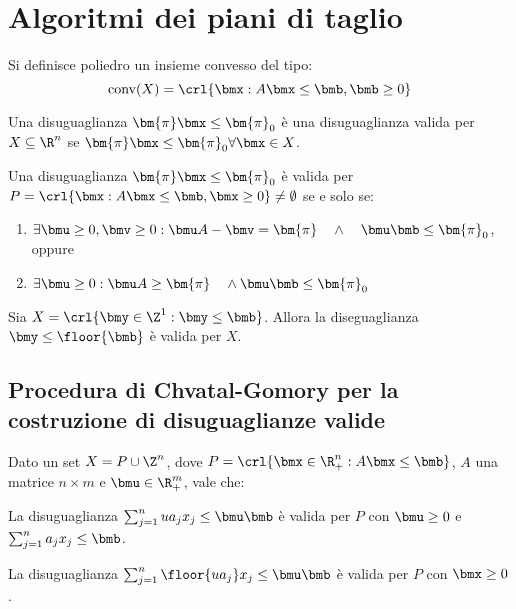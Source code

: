 \documentclass[\main/main.tex]{subfiles}
\begin{document}
\chapter{Algoritmi dei piani di taglio}

\begin{definition}[Poliedro]
    Si definisce poliedro un insieme convesso del tipo:
    \[
        \text{conv}(X) = \crl{\bmx: A\bmx \leq \bmb, \bmb \geq 0}
    \]
\end{definition}
\begin{definition}
    Una disuguaglianza \(\bm{\pi}\bmx \leq \bm{\pi}_0\) è una disuguaglianza valida per \(X \subseteq \R^n\) se \(\bm{\pi}\bmx \leq \bm{\pi}_0 \forall \bmx \in X\).
\end{definition}

\begin{proposition}
    Una disuguaglianza \(\bm{\pi}\bmx \leq \bm{\pi}_0\) è valida per \(P = \crl{\bmx: A\bmx \leq \bmb, \bmx \geq 0} \neq \emptyset \) se e solo se:
    \begin{enumerate}
    \item \(\exists \bmu \geq 0, \bmv \geq 0: \bmu A - \bmv = \bm{\pi} \quad \land \quad \bmu\bmb \leq \bm{\pi}_0\), oppure
    \item \(\exists \bmu \geq 0: \bmu A \geq \bm{\pi} \quad \land \bmu\bmb \leq \bm{\pi}_0\)
    \end{enumerate}
\end{proposition}

\begin{proposition}
    Sia \(X = \crl{\bmy \in \Z^1: \bmy \leq \bmb}\). Allora la diseguaglianza \(\bmy \leq \floor{\bmb}\) è valida per \(X\).
\end{proposition}

\section{Procedura di Chvatal-Gomory per la costruzione di disuguaglianze valide}
Dato un set \(X = P \cup \Z^n\), dove \(P = \crl{\bmx \in \R^n_+: A\bmx \leq \bmb}\), \(A\) una matrice \(n\times m\) e \(\bmu \in \R^m_+\), vale che:

La disuguaglianza \(\sum_{j=1}^n ua_j x_j \leq \bmu\bmb \) è valida per \(P\) con \(\bmu \geq 0\) e \(\sum_{j=1}^n a_j x_j \leq \bmb \).

La disuguaglianza \(\sum_{j=1}^n \floor{ua_j} x_j \leq \bmu\bmb \) è valida per \(P\) con \(\bmx \geq 0\).
\end{document}
